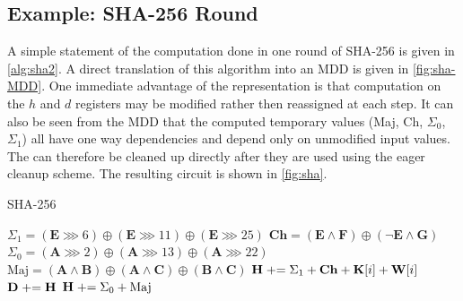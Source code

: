 

\subsection{Example: SHA-256 Round}

A simple statement of the computation done in one round of SHA-256 is given in
\cref{alg:sha2}. A direct translation of this algorithm into an MDD is given in
\cref{fig:sha-MDD}.  One immediate advantage of the representation is that
computation on the $h$ and $d$ registers may be modified rather then reassigned
at each step. It can also be seen from the MDD that the computed temporary values
(Maj, Ch, $\Sigma_0$,$\Sigma_1$) all have one way dependencies and depend only
on unmodified input values. The can therefore be cleaned up directly after they
are used using the eager cleanup scheme. The resulting circuit is shown in
\cref{fig:sha}.

\begin{algorithm}
\caption{SHA-256}
\label{alg:sha2}
\begin{algorithmic}
    \State \hspace*{1em} $\Sigma_1 = (\mathbf{E} \ggg 6) \oplus (\mathbf{E} \ggg 11) \oplus  (\mathbf{E} \ggg 25)$
    \State \hspace*{1em} $\mathbf{Ch} = (\mathbf{E} \land \mathbf{F}) \oplus ( \neg\mathbf{E}\land \mathbf{G})$
    \State \hspace*{1em} $\Sigma_0 = (\mathbf{A} \ggg 2) \oplus (\mathbf{A} \ggg 13) \oplus (\mathbf{A} \ggg 22)$
    \State \hspace*{1em} $\text{Maj} = (\mathbf{A} \land \mathbf{B}) \oplus (\mathbf{A} \land \mathbf{C}) \oplus (\mathbf{B}\land\mathbf{C})$
    \State \hspace*{1em} $\mathbf{H} \mathrel{+}= \Sigma_1 + \mathbf{Ch} + \mathbf{K}[i] + \mathbf{W}[i]$
    \State \hspace*{1em} $\mathbf{D} \mathrel{+}= \mathbf{H}$
    \State \hspace*{1em} $\mathbf{H} \mathrel{+}= \Sigma_0 + \text{Maj}$
  \EndFor
\end{algorithmic}
\end{algorithm}

